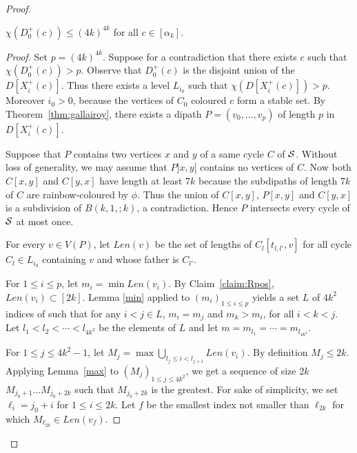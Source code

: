 \documentclass{endm}
\begin{document}
\begin{proof}
\begin{claim}\label{claim:D0}
$\chi(D^+_0(c))\leq (4k)^{4k}$ for all $c\in [\alpha_k]$. 
\end{claim}
\begin{proof}
Set $p=(4k)^{4k}$.
Suppose for a contradiction that there exists $c$ such that $\chi(D^+_0(c)) > p$. 
Observe that $D^+_0(c)$ is the disjoint union of the $D[X^+_i(c)]$. Thus there exists a level $L_{i_0}$ such that $\chi(D[X^+_i(c)]) >p$.
Moreover $i_0>0$, because the vertices of $C_0$ coloured $c$ form a stable set.
 By Theorem~\ref{thm:gallairoy}, there exists a dipath $P=(v_0,  \dots , v_{p})$ of length $p$ in $D[X^+_i(c)]$.



Suppose that $P$ contains two vertices $x$ and $y$ of a same cycle $C$ of ${\cal S}$. 
Without loss of generality, we may assume that $P]x,y[$ contains no vertices of $C$.
Now  both $C[x,y]$ and $C[y,x]$ have length at least $7k$ because the subdipaths of  length $7k$ of $C$ are rainbow-coloured by $\phi$. 
Thus the union of $C[x,y]$, $P[x,y]$ and $C[y,x]$ is a subdivision of $B(k,1,;k)$, a contradiction.
Hence $P$ intersects every cycle of ${\cal S}$ at most once.



\medskip


For every $v\in V(P)$, let $Len(v)$ be the set of lengths of $C_l[t_{l,l'},v]$ for all cycle $C_l \in  L_{i_0}$ containing $v$ and whose father is $C_{l'}$.


For $1\leq i\leq p$, let $m_i = \min Len(v_i)$. By Claim~\ref{claim:Rpos}, $Len(v_i) \subset [2k]$.
Lemma \ref{min} applied to $(m_i)_{1\leq i\leq p}$ yields a set $L$ of $4k^2$ indices of such that 
for any $i< j \in L$,  $m_i=m_j$ and $m_k > m_i$, for all $i< k < j$.
Let $l_1 < l_2 < \cdots < l_{4k^2}$ be the elements of $L$ and let $m= m_{l_1} = \cdots = m_{l_{4k^2}}$.


For $1\leq j\leq 4k^2-1$, let $M_j = \max \bigcup_{l_j\leq i < l_{j+1}} Len(v_i)$.
By definition $M_j\leq 2k$.
Applying Lemma~\ref{max} to $(M_j)_{1\leq j\leq 4k^2}$,  we get a sequence of size $2k$ $M_{j_0+1} \dots M_{j_0+{2k}}$ such that $M_{j_0+{2k}}$ is the greatest. 
For sake of simplicity, we set $\ell_i =j_0+i$ for $1\leq i\leq 2k$.
Let $f$ be  the smallest index not smaller than $\ell_{2k}$ for which $M_{\ell_{2k}} \in Len (v_f)$. 


\end{proof}
\end{proof}
\end{document}
